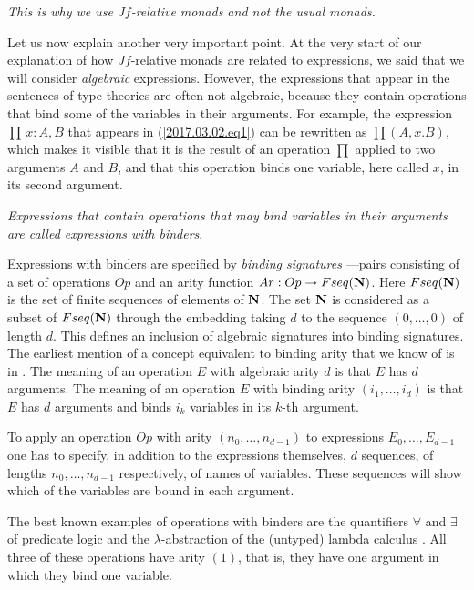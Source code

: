 \documentclass[12pt]{amsart}
\newcommand{\sr}{\rightarrow}
\newcommand{\nn}{{\bf N\rm}}
\newcommand{\nat}{\nn}
\begin{document}
{\em This is why we use $Jf$-relative monads and not the usual monads.}

Let us now explain another very important point. At the very start of our
explanation of how $Jf$-relative monads are related to expressions, we said
that we will consider {\em algebraic} expressions. However, the expressions
that appear in the sentences of type theories are often not algebraic, because
they contain operations that bind some of the variables in their
arguments. For example, the expression $\prod\,x:A,B$ that appears in
(\ref{2017.03.02.eq1}) can be rewritten as $\prod(A,x.B)$, which makes it
visible that it is the result of an operation $\prod$ applied to two arguments
$A$ and $B$, and that this operation binds one variable, here called $x$, in its
second argument.

{\em Expressions that contain operations that may bind variables in their
  arguments are called expressions with binders}.
 
Expressions with binders are specified by {\em binding signatures}%
---pairs consisting of a set of operations $Op$ and an arity function $Ar:Op\sr Fseq(\nat)$.
Here $Fseq(\nat)$ is the set of finite sequences of elements of
$\nat$. The set $\nat$ is considered as a subset of $Fseq(\nat)$ through the
embedding taking $d$ to the sequence $(0,\dots,0)$ of length $d$. This defines
an inclusion of algebraic signatures into binding signatures. The earliest
mention of a concept equivalent to binding arity that we know of is in
\cite{Aczel1978}. The meaning of an operation $E$ with algebraic arity $d$
is that $E$ has $d$ arguments. The meaning of an operation $E$ with binding
arity $(i_1,\dots,i_d)$ is that $E$ has $d$ arguments and binds $i_k$ variables
in its $k$-th argument.

To apply an operation $Op$ with arity $(n_0,\dots,n_{d-1})$ to expressions
$E_0,\dots,E_{d-1}$ one has to specify, in addition to the expressions
themselves, $d$ sequences, of lengths $n_0,\dots,n_{d-1}$ respectively, of
names of variables. These sequences will show which of the variables are bound
in each argument.

The best known examples of operations with binders are the quantifiers
$\forall$ and $\exists$ of predicate logic and the $\lambda$-abstraction of the
(untyped) lambda calculus \cite{Church1932,Barendregt}. All three of
these operations have arity $(1)$, that is, they have one argument in which
they bind one variable.
\end{document}
